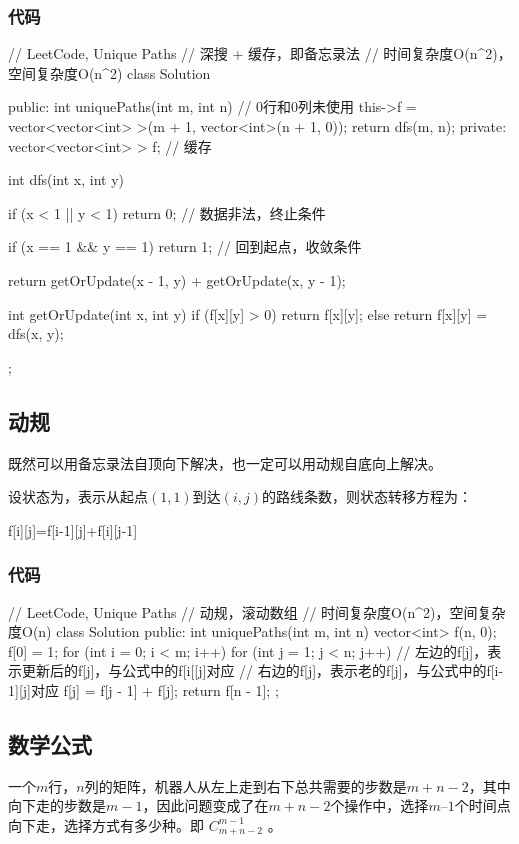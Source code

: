 \subsubsection{代码}
\begin{Code}
	// LeetCode, Unique Paths
	// 深搜 + 缓存，即备忘录法
	// 时间复杂度O(n^2)，空间复杂度O(n^2)
	class Solution {
		public:
		int uniquePaths(int m, int n) {
			// 0行和0列未使用
			this->f = vector<vector<int> >(m + 1, vector<int>(n + 1, 0));
			return dfs(m, n);
		}
		private:
		vector<vector<int> > f;  // 缓存
		
		int dfs(int x, int y) {
			if (x < 1 || y < 1) return 0; // 数据非法，终止条件
			
			if (x == 1 && y == 1) return 1; // 回到起点，收敛条件
			
			return getOrUpdate(x - 1, y) + getOrUpdate(x, y - 1);
		}
		
		int getOrUpdate(int x, int y) {
			if (f[x][y] > 0) return f[x][y];
			else return f[x][y] = dfs(x, y);
		}
	};
\end{Code}


\subsection{动规}
既然可以用备忘录法自顶向下解决，也一定可以用动规自底向上解决。

设状态为，表示从起点$(1,1)$到达$(i,j)$的路线条数，则状态转移方程为：
\begin{Code}
	f[i][j]=f[i-1][j]+f[i][j-1]
\end{Code}


\subsubsection{代码}
\begin{Code}
	// LeetCode, Unique Paths
	// 动规，滚动数组
	// 时间复杂度O(n^2)，空间复杂度O(n)
	class Solution {
		public:
		int uniquePaths(int m, int n) {
			vector<int> f(n, 0);
			f[0] = 1;
			for (int i = 0; i < m; i++) {
				for (int j = 1; j < n; j++) {
					// 左边的f[j]，表示更新后的f[j]，与公式中的f[i[[j]对应
					// 右边的f[j]，表示老的f[j]，与公式中的f[i-1][j]对应
					f[j] = f[j - 1] + f[j];
				}
			}
			return f[n - 1];
		}
	};
\end{Code}


\subsection{数学公式}
一个$m$行，$n$列的矩阵，机器人从左上走到右下总共需要的步数是$m+n-2$，其中向下走的步数是$m-1$，因此问题变成了在$m+n-2$个操作中，选择$m–1$个时间点向下走，选择方式有多少种。即 $C_{m+n-2}^{m-1}$ 。

